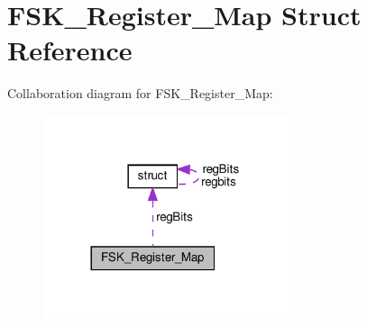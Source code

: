 \hypertarget{structFSK__Register__Map}{}\section{F\+S\+K\+\_\+\+Register\+\_\+\+Map Struct Reference}
\label{structFSK__Register__Map}


Collaboration diagram for F\+S\+K\+\_\+\+Register\+\_\+\+Map\+:\nopagebreak
\begin{figure}[H]
\begin{center}
\leavevmode
\includegraphics[width=204pt]{structFSK__Register__Map__coll__graph}
\end{center}
\end{figure}
